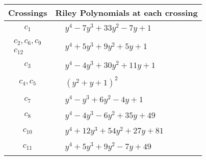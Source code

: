\documentclass[1p]{elsarticle_modified}
\theoremstyle{definition}
\begin{document}
\begin{tabular}{m{50pt}|m{274pt}}
Crossings & \hspace{64pt}Riley Polynomials at each crossing \\
\hline $$\begin{aligned}c_{1}\end{aligned}$$&$\begin{aligned}
&y^4-7 y^3+33 y^2-7 y+1
\end{aligned}$\\
\hline $$\begin{aligned}c_{2},c_{6},c_{9}\\c_{12}\end{aligned}$$&$\begin{aligned}
&y^4+5 y^3+9 y^2+5 y+1
\end{aligned}$\\
\hline $$\begin{aligned}c_{3}\end{aligned}$$&$\begin{aligned}
&y^4-4 y^3+30 y^2+11 y+1
\end{aligned}$\\
\hline $$\begin{aligned}c_{4},c_{5}\end{aligned}$$&$\begin{aligned}
&(y^2+y+1)^2
\end{aligned}$\\
\hline $$\begin{aligned}c_{7}\end{aligned}$$&$\begin{aligned}
&y^4- y^3+6 y^2-4 y+1
\end{aligned}$\\
\hline $$\begin{aligned}c_{8}\end{aligned}$$&$\begin{aligned}
&y^4-4 y^3-6 y^2+35 y+49
\end{aligned}$\\
\hline $$\begin{aligned}c_{10}\end{aligned}$$&$\begin{aligned}
&y^4+12 y^3+54 y^2+27 y+81
\end{aligned}$\\
\hline $$\begin{aligned}c_{11}\end{aligned}$$&$\begin{aligned}
&y^4+5 y^3+9 y^2-7 y+49
\end{aligned}$\\
\hline
\end{tabular}\\~\\
\end{document}
